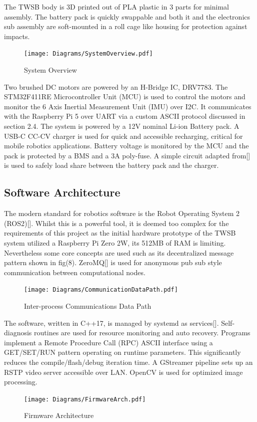         The TWSB body is 3D printed out of PLA plastic in 3 parts for minimal assembly.
        The battery pack is quickly swappable and both it and the electronics sub assembly 
        are soft-mounted in a roll cage like housing for protection against impacts. 
        \begin{figure}[H]
            \centering
            \texttt{[image: Diagrams/SystemOverview.pdf]}
            \caption{System Overview}
        \end{figure}

        Two brushed DC motors are powered by an H-Bridge IC, DRV7783. 
        The STM32F411RE Microcontroller Unit (MCU) is used to control the 
        motors and monitor the 6 Axis Inertial Measurement Unit (IMU) over I2C. It communicates with the 
        Raspberry Pi 5 over UART via a custom ASCII protocol discussed in section 2.4. 
        The system is powered by a 12V nominal Li-ion Battery pack. A USB-C CC-CV charger is used for quick 
        and accessible recharging, critical for mobile robotics applications. 
        Battery voltage is monitored by the MCU and the pack is protected by a BMS and a 3A poly-fuse.
        A simple circuit adapted from[] is used to safely load share between the battery pack and the charger.

        \subsection{Software Architecture}
        The modern standard for robotics software is the Robot Operating System 2 (ROS2)[]. 
        Whilst this is a powerful tool, it is deemed too complex for the requirements of this project
        as the initial hardware prototype of the TWSB system utilized a Raspberry Pi Zero 2W, 
        its 512MB of RAM is limiting. 
        Nevertheless some core concepts are used such as its 
        decentralized message pattern shown in fig(8). ZeroMQ[] is used for 
        anonymous pub sub style communication between computational nodes.
        \begin{figure} [H]
            \texttt{[image: Diagrams/CommunicationDataPath.pdf]}  
            \caption{Inter-process Communications Data Path}
        \end{figure}

        The software, written in C++17, is managed by systemd as services[]. 
        Self-diagnosis routines are used for resource monitoring and auto recovery. 
        Programs implement a Remote Procedure Call (RPC) ASCII interface using 
        a GET/SET/RUN pattern operating on runtime parameters. 
        This significantly reduces the compile/flash/debug iteration time. 
        A GStreamer pipeline sets up an RSTP video server accessible over LAN.
        OpenCV is used for optimized image processing.
        \begin{figure} [H]
            \texttt{[image: Diagrams/FirmwareArch.pdf]}
            \caption{Firmware Architecture}
        \end{figure}

